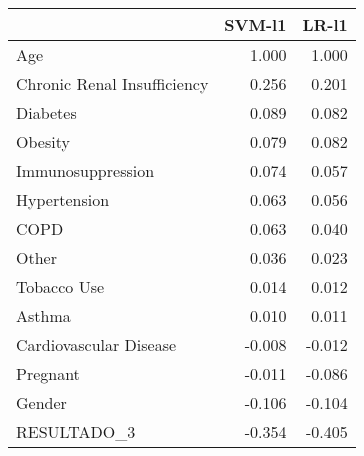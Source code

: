 \begin{tabular}{lrr}
\toprule
{} &  SVM-l1 &  LR-l1 \\
\midrule
Age                         &   1.000 &  1.000 \\
Chronic Renal Insufficiency &   0.256 &  0.201 \\
Diabetes                    &   0.089 &  0.082 \\
Obesity                     &   0.079 &  0.082 \\
Immunosuppression           &   0.074 &  0.057 \\
Hypertension                &   0.063 &  0.056 \\
COPD                        &   0.063 &  0.040 \\
Other                       &   0.036 &  0.023 \\
Tobacco Use                 &   0.014 &  0.012 \\
Asthma                      &   0.010 &  0.011 \\
Cardiovascular Disease      &  -0.008 & -0.012 \\
Pregnant                    &  -0.011 & -0.086 \\
Gender                      &  -0.106 & -0.104 \\
RESULTADO\_3                 &  -0.354 & -0.405 \\
\bottomrule
\end{tabular}
